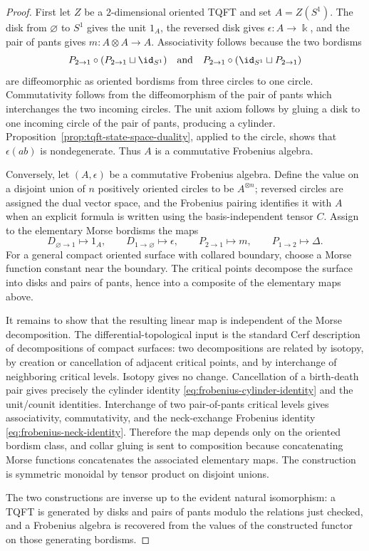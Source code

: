 \begin{proof}
First let \(Z\) be a \(2\)-dimensional oriented TQFT and set
\(A=Z(S^1)\).  The disk from \(\varnothing\) to \(S^1\) gives the unit
\(1_A\), the reversed disk gives \(\epsilon:A\to\Bbbk\), and the pair of
pants gives \(m:A\otimes A\to A\).  Associativity follows because the two
bordisms
\[
  P_{2\to1}\circ(P_{2\to1}\sqcup\id_{S^1})
  \quad\hbox{and}\quad
  P_{2\to1}\circ(\id_{S^1}\sqcup P_{2\to1})
\]
are diffeomorphic as oriented bordisms from three circles to one circle.
Commutativity follows from the diffeomorphism of the pair of pants which
interchanges the two incoming circles.  The unit axiom follows by gluing a
disk to one incoming circle of the pair of pants, producing a cylinder.
Proposition~\ref{prop:tqft-state-space-duality}, applied to the circle,
shows that \(\epsilon(ab)\) is nondegenerate.  Thus \(A\) is a commutative
Frobenius algebra.

Conversely, let \((A,\epsilon)\) be a commutative Frobenius algebra.  Define
the value on a disjoint union of \(n\) positively oriented circles to be
\(A^{\otimes n}\); reversed circles are assigned the dual vector space, and
the Frobenius pairing identifies it with \(A\) when an explicit formula is
written using the basis-independent tensor \(C\).  Assign to the elementary
Morse bordisms the maps
\[
  D_{\varnothing\to1}\mapsto 1_A,\qquad
  D_{1\to\varnothing}\mapsto\epsilon,\qquad
  P_{2\to1}\mapsto m,\qquad
  P_{1\to2}\mapsto\Delta .
\]
For a general compact oriented surface with collared boundary, choose a
Morse function constant near the boundary.  The critical points decompose
the surface into disks and pairs of pants, hence into a composite of the
elementary maps above.

It remains to show that the resulting linear map is independent of the Morse
decomposition.  The differential-topological input is the standard Cerf
description of decompositions of compact surfaces: two decompositions are
related by isotopy, by creation or cancellation of adjacent critical points,
and by interchange of neighboring critical levels.  Isotopy gives no change.
Cancellation of a birth-death pair gives precisely the cylinder identity
\eqref{eq:frobenius-cylinder-identity} and the unit/counit identities.
Interchange of two pair-of-pants critical levels gives associativity,
commutativity, and the neck-exchange Frobenius identity
\eqref{eq:frobenius-neck-identity}.  Therefore the map depends only on the
oriented bordism class, and collar gluing is sent to composition because
concatenating Morse functions concatenates the associated elementary maps.
The construction is symmetric monoidal by tensor product on disjoint unions.

The two constructions are inverse up to the evident natural isomorphism: a
TQFT is generated by disks and pairs of pants modulo the relations just
checked, and a Frobenius algebra is recovered from the values of the
constructed functor on those generating bordisms.
\end{proof}

